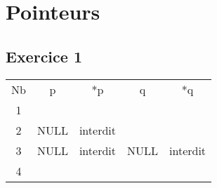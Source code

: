 \chapter{Pointeurs}
\section{Exercice 1}


\begin{tabular}{c|c|c|c|c|}
	\hline
	Nb&p&*p&q&*q\\
	1 & &  & & \\ 
	2 &NULL & interdit & & \\ 
	3 & NULL &interdit & NULL & interdit\\
	4 &  
\end{tabular}

